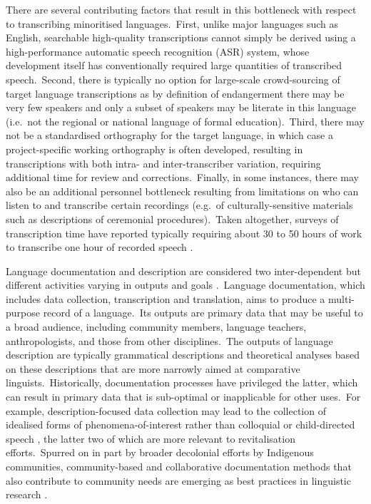 \documentclass[main.tex]{subfiles}
\begin{document}
There are several contributing factors that result in this bottleneck with respect to transcribing minoritised languages.~First, unlike major languages such as English, searchable high-quality transcriptions cannot simply be derived using a high-performance automatic speech recognition (ASR) system, whose development itself has conventionally required large quantities of transcribed speech.~Second, there is typically no option for large-scale crowd-sourcing of target language transcriptions as by definition of endangerment there may be very few speakers and only a subset of speakers may be literate in this language (i.e.~not the regional or national language of formal education).~Third, there may not be a standardised orthography for the target language, in which case a project-specific working orthography is often developed, resulting in transcriptions with both intra- and inter-transcriber variation, requiring additional time for review and corrections.~Finally, in some instances, there may also be an additional personnel bottleneck resulting from limitations on who can listen to and transcribe certain recordings (e.g.~of culturally-sensitive materials such as descriptions of ceremonial procedures).~Taken altogether, surveys of transcription time have reported typically requiring about 30 to 50 hours of work to transcribe one hour of recorded speech \parencite{durantin2017survey,michaud2014towards,zahrer2020towards}.

Language documentation and description are considered two inter-dependent but different activities varying in outputs and goals \parencite{himmelmann1998documentary}.~Language documentation, which includes data collection, transcription and translation, aims to produce a multi-purpose record of a language.~Its outputs are primary data that may be useful to a broad audience, including community members, language teachers, anthropologists, and those from other disciplines.~The outputs of language description are typically grammatical descriptions and theoretical analyses based on these descriptions that are more narrowly aimed at comparative linguists.~Historically, documentation processes have privileged the latter, which can result in primary data that is sub-optimal or inapplicable for other uses.~For example, description-focused data collection may lead to the collection of idealised forms of phenomena-of-interest rather than colloquial or child-directed speech \parencite{rouvier2017language}, the latter two of which are more relevant to revitalisation efforts.~Spurred on in part by broader decolonial efforts by Indigenous communities, community-based and collaborative documentation methods that also contribute to community needs are emerging as best practices in linguistic research \parencite{holton2022indigenous}.
\end{document}
